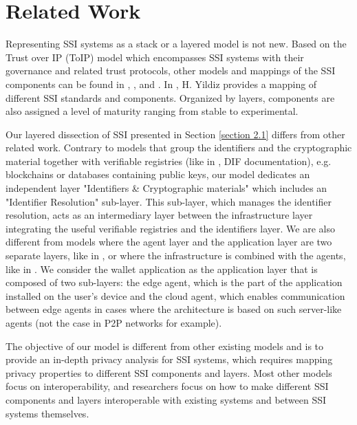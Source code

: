 \section{Related Work}
\label{RelatedWork}
Representing SSI systems as a stack or a layered model is not new. Based on the Trust over IP (ToIP) model \cite{ToIP} which encompasses SSI systems with their governance and related trust protocols, other models and mappings of the SSI components can be found in \cite{s22155641}, \cite{mapping}, \cite{Yildiz} and \cite{layering-diagram}. In \cite{mapping}, H. Yildiz provides a mapping of different SSI standards and components. Organized by layers, components are also assigned a level of maturity ranging from stable to experimental.

Our layered dissection of SSI presented in Section \ref{section 2.1} differs from other related work. Contrary to models that group the identifiers and the cryptographic material together with verifiable registries (like in \cite{layering-diagram}, DIF documentation), e.g. blockchains or databases containing public keys, our model dedicates an independent layer "Identifiers \& Cryptographic materials" which includes an "Identifier Resolution" sub-layer. This sub-layer, which manages the identifier resolution, acts as an intermediary layer between the infrastructure layer integrating the useful verifiable registries and the identifiers layer. We are also different from models where the agent layer and the application layer are two separate layers, like in \cite{Yildiz}, or where the infrastructure is combined with the agents, like in \cite{layering-diagram}. We consider the wallet application as the application layer that is composed of two sub-layers: the edge agent, which is the part of the application installed on the user's device and the cloud agent, which enables communication between edge agents in cases where the architecture is based on such server-like agents (not the case in P2P networks for example).


The objective of our model is different from other existing models and is to provide an in-depth privacy analysis for SSI systems, which requires mapping privacy properties to different SSI components and layers. Most other models focus on interoperability, and researchers focus on how to make different SSI components and layers interoperable with existing systems and between SSI systems themselves. 

